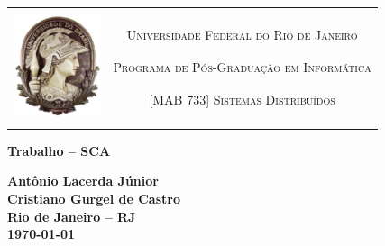 \begin{titlepage}
\begin{center}

\begin{table}[h]
\centering
\setlength{\arrayrulewidth}{3.5\arrayrulewidth}
    \begin{tabular}{cc}
    \hline\\
    \multirow{5}{*}{\includegraphics[height=3cm]{imgs/ufrj}}&\\
    & \textsc{Universidade Federal do Rio de Janeiro}\\
    & \textsc{Programa de Pós-Graduação em Informática}\\
    & \textsc{[MAB 733] Sistemas Distribuídos}\\
    &\\
    &\\
    \hline
    \end{tabular}
\end{table}


\vfill

\LARGE
\textbf{Trabalho -- SCA}

\vfill

\normalsize
\textbf{Antônio Lacerda Júnior}\\
\textbf{Cristiano Gurgel de Castro}\\

\vfill
\textbf{Rio de Janeiro -- RJ}\\
\textbf{\today}

\end{center}
\end{titlepage}

